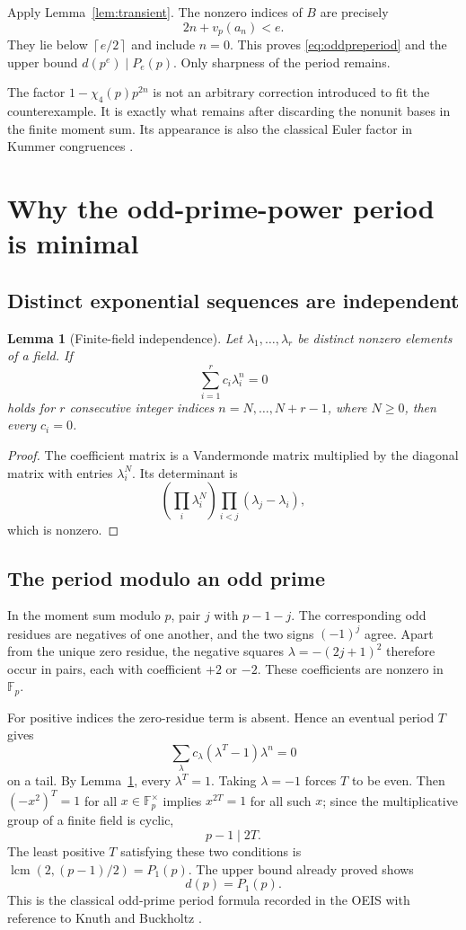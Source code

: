 \documentclass[11pt,a4paper]{article}
\numberwithin{equation}{section}
\newtheorem{lemma}[theorem]{Lemma}
\theoremstyle{definition}
\newcommand{\F}{\mathbb F}
\newcommand{\ceil}[1]{\left\lceil #1\right\rceil}
\DeclareMathOperator{\lcm}{lcm}
\begin{document}
Apply Lemma~\ref{lem:transient}. The nonzero indices of $B$ are precisely
\[
2n+v_p(a_n)<e.
\]
They lie below $\ceil{e/2}$ and include $n=0$. This proves
\eqref{eq:oddpreperiod} and the upper bound $d(p^e)\mid P_e(p)$.
Only sharpness of the period remains.

The factor $1-\chi_4(p)p^{2n}$ is not an arbitrary correction introduced to
fit the counterexample. It is exactly what remains after discarding the
nonunit bases in the finite moment sum. Its appearance is also the
classical Euler factor in Kummer congruences \cite{metsankyla}.

\section{Why the odd-prime-power period is minimal}
\label{sec:oddperiod}

\subsection{Distinct exponential sequences are independent}

\begin{lemma}[Finite-field independence]\label{lem:vandermonde}
Let $\lambda_1,\ldots,\lambda_r$ be distinct nonzero elements of a field.
If
\[
\sum_{i=1}^r c_i\lambda_i^n=0
\]
holds for $r$ consecutive integer indices $n=N,\ldots,N+r-1$, where
$N\ge0$, then every $c_i=0$.
\end{lemma}

\begin{proof}
The coefficient matrix is a Vandermonde matrix multiplied by the diagonal
matrix with entries $\lambda_i^N$. Its determinant is
\[
\left(\prod_i\lambda_i^N\right)
\prod_{i<j}(\lambda_j-\lambda_i),
\]
which is nonzero.
\end{proof}

\subsection{The period modulo an odd prime}

In the moment sum modulo $p$, pair $j$ with $p-1-j$. The corresponding
odd residues are negatives of one another, and the two signs $(-1)^j$
agree. Apart from the unique zero residue, the negative squares
$\lambda=-(2j+1)^2$ therefore occur in pairs, each with coefficient $+2$
or $-2$. These coefficients are nonzero in $\F_p$.

For positive indices the zero-residue term is absent. Hence an eventual
period $T$ gives
\[
\sum_{\lambda}c_\lambda(\lambda^T-1)\lambda^n=0
\]
on a tail. By Lemma~\ref{lem:vandermonde}, every $\lambda^T=1$.
Taking $\lambda=-1$ forces $T$ to be even. Then $(-x^2)^T=1$ for all
$x\in\F_p^\times$ implies $x^{2T}=1$ for all such $x$; since the
multiplicative group of a finite field is cyclic,
\[
p-1\mid2T.
\]
The least positive $T$ satisfying these two conditions is
$\lcm(2,(p-1)/2)=P_1(p)$. The upper bound already proved shows
\begin{equation}\label{eq:baseperiod}
d(p)=P_1(p).
\end{equation}
This is the classical odd-prime period formula recorded in the OEIS with
reference to Knuth and Buckholtz \cite{oeis,knuth}.
\end{document}
